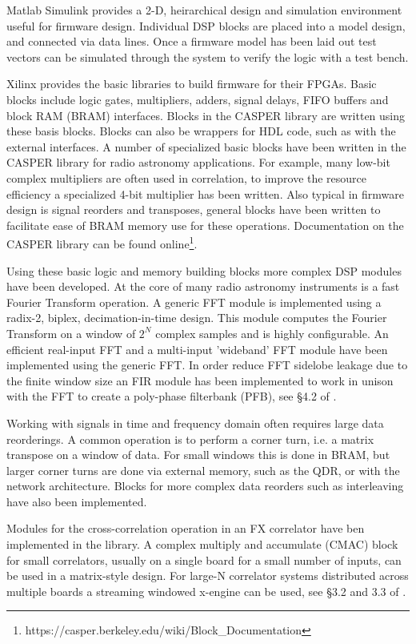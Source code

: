 \documentclass{ws-jai}
\begin{document}
Matlab Simulink provides a 2-D, heirarchical design and simulation environment
useful for firmware design. Individual DSP blocks are placed into a model
design, and connected via data lines. Once a firmware model has been laid out
test vectors can be simulated through the system to verify the logic with a test
bench.

Xilinx provides the basic libraries to build firmware for their FPGAs. Basic
blocks include logic gates, multipliers, adders, signal delays, FIFO buffers and
block RAM (BRAM) interfaces. Blocks in the CASPER library are written using
these basis blocks. Blocks can also be wrappers for HDL code, such as with the
external interfaces. A number of specialized basic blocks have been written in
the CASPER library for radio astronomy applications. For example, many low-bit
complex multipliers are often used in correlation, to improve the resource
efficiency a specialized 4-bit multiplier has been written. Also typical in
firmware design is signal reorders and transposes, general blocks have been
written to facilitate ease of BRAM memory use for these operations.
Documentation on the CASPER library can be found
online\footnote{https://casper.berkeley.edu/wiki/Block\_Documentation}.

Using these basic logic and memory building blocks more complex DSP modules have
been developed. At the core of many radio astronomy instruments is a fast Fourier
Transform operation. A generic FFT module is implemented using a radix-2,
biplex, decimation-in-time design. This module computes the Fourier Transform on
a window of $2^N$ complex samples and is highly configurable. An efficient
real-input FFT and a multi-input 'wideband' FFT module have been implemented
using the generic FFT. In order reduce FFT sidelobe leakage due to the finite
window size an FIR module has been implemented to work in unison with the FFT to
create a poly-phase filterbank (PFB), see \S 4.2 of \citet{price13}.

Working with signals in time and frequency domain often requires large data
reorderings. A common operation is to perform a corner turn, i.e. a matrix
transpose on a window of data. For small windows this is done in BRAM, but
larger corner turns are done via external memory, such as the QDR, or with the
network architecture. Blocks for more complex data reorders such as interleaving
have also been implemented.

Modules for the cross-correlation operation in an FX correlator have ben
implemented in the library. A complex multiply and accumulate (CMAC) block for
small correlators, usually on a single board for a small number of inputs, can
be used in a matrix-style design. For large-N correlator systems distributed
across multiple boards a streaming windowed x-engine can be used, see \S 3.2 and
3.3 of \citet{hickish14}.
\end{document}
